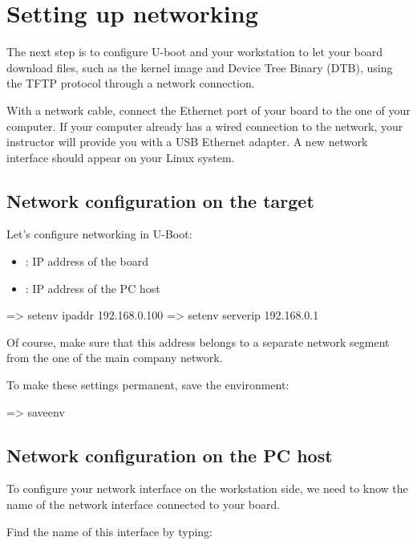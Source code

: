 \section{Setting up networking}

The next step is to configure U-boot and your workstation to let your
board download files, such as the kernel image and Device Tree Binary
(DTB), using the TFTP protocol through a network connection.

With a network cable, connect the Ethernet port of
your board to the one of your computer. If your computer already has a
wired connection to the network, your instructor will provide you with
a USB Ethernet adapter. A new network interface should appear on your
Linux system.

\subsection{Network configuration on the target}

Let's configure networking in U-Boot:

\begin{itemize}
\item {}: IP address of the board
\item {}: IP address of the PC host
\end{itemize}

\begin{ubootinput}
=> setenv ipaddr 192.168.0.100
=> setenv serverip 192.168.0.1
\end{ubootinput}

Of course, make sure that this address belongs to a separate network
segment from the one of the main company network.

To make these settings permanent, save the environment:

\begin{ubootinput}
=> saveenv
\end{ubootinput}

\subsection{Network configuration on the PC host}

To configure your network interface on the workstation side, we need
to know the name of the network interface connected to your board.

Find the name of this interface by typing:

